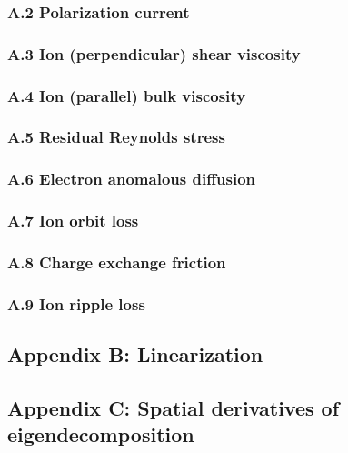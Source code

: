 \documentclass[]{article}
\begin{document}
\subsubsection{A.2 Polarization current}\label{a.2-polarization-current}

\subsubsection{A.3 Ion (perpendicular) shear
viscosity}\label{a.3-ion-perpendicular-shear-viscosity}

\subsubsection{A.4 Ion (parallel) bulk
viscosity}\label{a.4-ion-parallel-bulk-viscosity}

\subsubsection{A.5 Residual Reynolds
stress}\label{a.5-residual-reynolds-stress}

\subsubsection{A.6 Electron anomalous
diffusion}\label{a.6-electron-anomalous-diffusion}

\subsubsection{A.7 Ion orbit loss}\label{a.7-ion-orbit-loss}

\subsubsection{A.8 Charge exchange
friction}\label{a.8-charge-exchange-friction}

\subsubsection{A.9 Ion ripple loss}\label{a.9-ion-ripple-loss}

\subsection{Appendix B: Linearization}\label{appendix-b-linearization}

\subsection{Appendix C: Spatial derivatives of
eigendecomposition}\label{appendix-c-spatial-derivatives-of-eigendecomposition}
\end{document}
